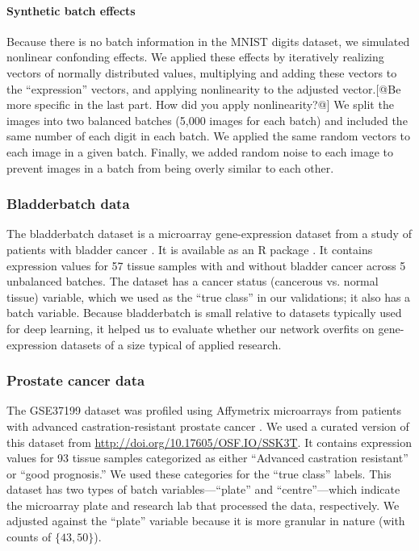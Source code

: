 \documentclass[11pt]{article}
\begin{document}
\paragraph{Synthetic batch effects}

Because there is no batch information in the MNIST digits dataset, we simulated nonlinear confonding effects.
We applied these effects by iteratively realizing vectors of normally distributed values, multiplying and adding these vectors to the ``expression'' vectors, and applying nonlinearity to the adjusted vector.[@Be more specific in the last part. How did you apply nonlinearity?@]
We split the images into two balanced batches (5,000 images for each batch) and included the same number of each digit in each batch.
We applied the same random vectors to each image in a given batch.
Finally, we added random noise to each image to prevent images in a batch from being overly similar to each other.

\subsubsection{Bladderbatch data}

The bladderbatch dataset is a microarray gene-expression dataset from a study of patients with bladder cancer \cite{dyrskjot_gene_2004}.
It is available as an R package \cite{leek_bladderbatch_2017}.
It contains expression values for 57 tissue samples with and without bladder cancer across 5 unbalanced batches.
The dataset has a cancer status (cancerous vs. normal tissue) variable, which we used as the ``true class'' in our validations; it also has a batch variable.
Because bladderbatch is small relative to datasets typically used for deep learning, it helped us to evaluate whether our network overfits on gene-expression datasets of a size typical of applied research.

\subsubsection{Prostate cancer data}

The GSE37199 dataset was profiled using Affymetrix microarrays from patients with advanced castration-resistant prostate cancer \cite{olmos_prognostic_2012}.
We used a curated version of this dataset from \url{http://doi.org/10.17605/OSF.IO/SSK3T}\cite{golightly_curated_2018}.
It contains expression values for 93 tissue samples categorized as either ``Advanced castration resistant'' or ``good prognosis.''
We used these categories for the ``true class'' labels.
This dataset has two types of batch variables---``plate'' and ``centre''---which indicate the microarray plate and research lab that processed the data, respectively.
We adjusted against the ``plate'' variable because it is more granular in nature (with counts of $\{43, 50\}$).
\end{document}
